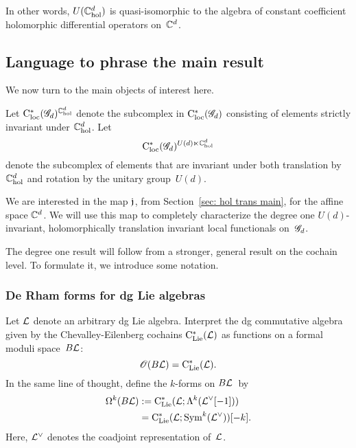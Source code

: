 In other words, $U(\mathbb C^{d}_{\rm hol})$ is quasi-isomorphic to the algebra of constant coefficient holomorphic differential operators on~$\mathbb C^d$. 

\subsection{Language to phrase the main result}

We now turn to the main objects of interest here.

\begin{dfn}
Let ${\rm C}_{\rm loc}^*(\mathscr G_d)^{\mathbb C^d_{\rm hol}}$ denote the subcomplex in ${\rm C}_{\rm loc}^*(\mathscr G_d)$ consisting of elements strictly invariant under $\mathbb C^d_{\rm hol}$.
Let
\[
{\rm C}_{\rm loc}^*(\mathscr G_d)^{U(d) \ltimes \mathbb C^d_{\rm hol}}
\]
denote the subcomplex of elements that are invariant under both translation by $\mathbb C^d_{\rm hol}$ and rotation by the unitary group~$U(d)$.
\end{dfn}

We are interested in the map $\mathfrak j$, from Section~\ref{sec: hol trans main}, for the affine space $\mathbb C^d$.
We will use this map to completely characterize the degree one $U(d)$-invariant, holomorphically translation invariant local functionals on~$\mathscr G_d$. 

The degree one result will follow from a stronger, general result on the cochain level.
To formulate it, we introduce some notation.

\subsubsection{De Rham forms for dg Lie algebras}

Let $\mathcal L$ denote an arbitrary dg Lie algebra. 
Interpret the dg commutative algebra given by the Chevalley-Eilenberg cochains ${\rm C}_{{\rm Lie}}^*(\mathcal L)$ as functions on a formal moduli space~$B \mathcal L$:
\[
\mathscr O(B \mathcal L) = {\rm C}_{{\rm Lie}}^*(\mathcal L) .
\]
In the same line of thought, define the $k$-forms on $B\mathcal L$~by
\begin{align*}
\Omega^k(B \mathcal L) & := {\rm C}_{{\rm Lie}}^*(\mathcal L ; \Lambda^k(\mathcal L^\vee [-1])) \\
 & =  {\rm C}_{{\rm Lie}}^*(\mathcal L ; {\rm Sym}^k(\mathcal L^\vee))[-k] .  
\end{align*}
Here, $\mathcal L^\vee$ denotes the coadjoint representation of~$\mathcal L$. 

